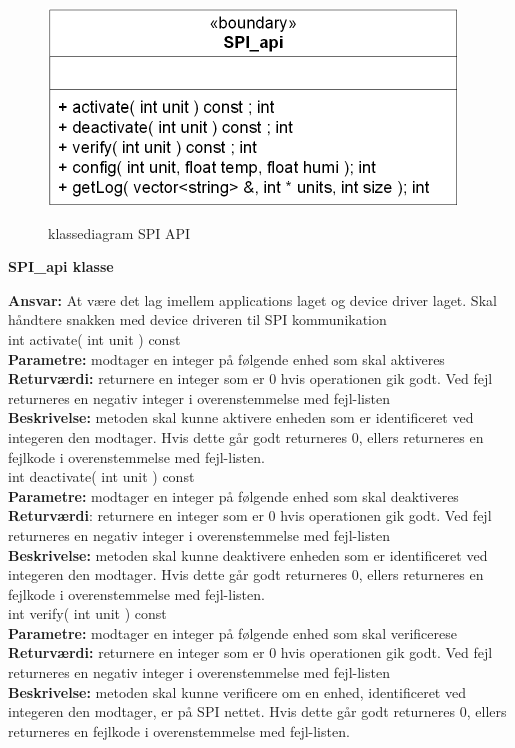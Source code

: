 
\begin{figure}[htbp] \centering
{\includegraphics[scale=1.5]{filer/design/Klassediagrammer/SPI_API}}
\caption{klassediagram SPI API}
\label{fig:SPI API klassediagram}
\end{figure} 

{\centering
\textbf{SPI\_api klasse}\par
}
\textbf{Ansvar:} At være det lag imellem applications laget og device driver laget. Skal håndtere snakken med device driveren til SPI kommunikation \\

int activate( int unit ) const \\
\textbf{Parametre:} modtager en integer på følgende enhed som skal aktiveres \\
\textbf{Returværdi:} returnere en integer som er 0 hvis operationen gik godt. Ved fejl returneres en negativ integer i overenstemmelse med fejl-listen \\
\textbf{Beskrivelse:} metoden skal kunne aktivere enheden som er identificeret ved integeren den modtager. Hvis dette går godt returneres 0, ellers returneres en fejlkode i overenstemmelse med fejl-listen.\\

int deactivate( int unit ) const \\
\textbf{Parametre:}  modtager en integer på følgende enhed som skal deaktiveres\\
\textbf{Returværdi}: returnere en integer som er 0 hvis operationen gik godt. Ved fejl returneres en negativ integer i overenstemmelse med fejl-listen  \\
\textbf{Beskrivelse:} metoden skal kunne deaktivere enheden som er identificeret ved integeren den modtager. Hvis dette går godt returneres 0, ellers returneres en fejlkode i overenstemmelse med fejl-listen.\\

int verify( int unit ) const \\
\textbf{Parametre:}  modtager en integer på følgende enhed som skal verificerese\\
\textbf{Returværdi:} returnere en integer som er 0 hvis operationen gik godt. Ved fejl returneres en negativ integer i overenstemmelse med fejl-listen  \\
\textbf{Beskrivelse:} metoden skal kunne verificere om en enhed, identificeret ved integeren den modtager, er på SPI nettet. Hvis dette går godt returneres 0, ellers returneres en fejlkode i overenstemmelse med fejl-listen.\\

